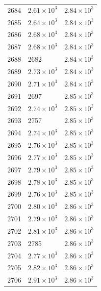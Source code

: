 \begin{table}[H]
\begin{tabular}{lll}
2684 & $\displaystyle 2.61 \times 10^{3}$ & $\displaystyle 2.84 \times 10^{3}$ \\
2685 & $\displaystyle 2.64 \times 10^{3}$ & $\displaystyle 2.84 \times 10^{3}$ \\
2686 & $\displaystyle 2.68 \times 10^{3}$ & $\displaystyle 2.84 \times 10^{3}$ \\
2687 & $\displaystyle 2.68 \times 10^{3}$ & $\displaystyle 2.84 \times 10^{3}$ \\
2688 & 2682 & $\displaystyle 2.84 \times 10^{3}$ \\
2689 & $\displaystyle 2.73 \times 10^{3}$ & $\displaystyle 2.84 \times 10^{3}$ \\
2690 & $\displaystyle 2.71 \times 10^{3}$ & $\displaystyle 2.84 \times 10^{3}$ \\
2691 & 2697 & $\displaystyle 2.85 \times 10^{3}$ \\
2692 & $\displaystyle 2.74 \times 10^{3}$ & $\displaystyle 2.85 \times 10^{3}$ \\
2693 & 2757 & $\displaystyle 2.85 \times 10^{3}$ \\
2694 & $\displaystyle 2.74 \times 10^{3}$ & $\displaystyle 2.85 \times 10^{3}$ \\
2695 & $\displaystyle 2.76 \times 10^{3}$ & $\displaystyle 2.85 \times 10^{3}$ \\
2696 & $\displaystyle 2.77 \times 10^{3}$ & $\displaystyle 2.85 \times 10^{3}$ \\
2697 & $\displaystyle 2.79 \times 10^{3}$ & $\displaystyle 2.85 \times 10^{3}$ \\
2698 & $\displaystyle 2.78 \times 10^{3}$ & $\displaystyle 2.85 \times 10^{3}$ \\
2699 & $\displaystyle 2.76 \times 10^{3}$ & $\displaystyle 2.85 \times 10^{3}$ \\
2700 & $\displaystyle 2.80 \times 10^{3}$ & $\displaystyle 2.86 \times 10^{3}$ \\
2701 & $\displaystyle 2.79 \times 10^{3}$ & $\displaystyle 2.86 \times 10^{3}$ \\
2702 & $\displaystyle 2.81 \times 10^{3}$ & $\displaystyle 2.86 \times 10^{3}$ \\
2703 & 2785 & $\displaystyle 2.86 \times 10^{3}$ \\
2704 & $\displaystyle 2.77 \times 10^{3}$ & $\displaystyle 2.86 \times 10^{3}$ \\
2705 & $\displaystyle 2.82 \times 10^{3}$ & $\displaystyle 2.86 \times 10^{3}$ \\
2706 & $\displaystyle 2.91 \times 10^{3}$ & $\displaystyle 2.86 \times 10^{3}$ \\

\end{tabular}
\end{table}
